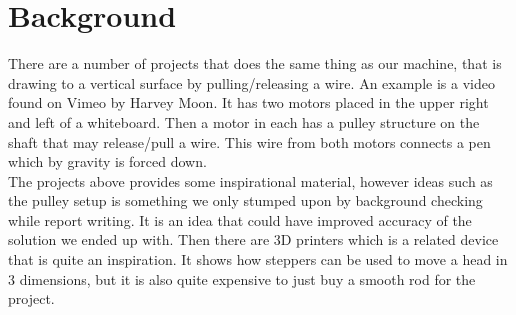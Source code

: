 
\section{Background}
There are a number of projects that does the same thing as our machine, that is drawing to a vertical surface by pulling/releasing a wire. An example is a video found on Vimeo\citep{Vimio:2010:DrawingMachine} by Harvey Moon. It has two motors placed in the upper right and left of a whiteboard. Then a motor in each has a pulley structure on the shaft that may release/pull a wire. This wire from both motors connects a pen which by gravity is forced down.\\

The projects above provides some inspirational material, however ideas such as the pulley setup is something we only stumped upon by background checking while report writing. It is an idea that could have improved accuracy of the solution we ended up with. Then there are 3D printers which is a related device that is quite an inspiration. It shows how steppers can be used to move a head in 3 dimensions, but it is also quite expensive to just buy a smooth rod for the project. 
